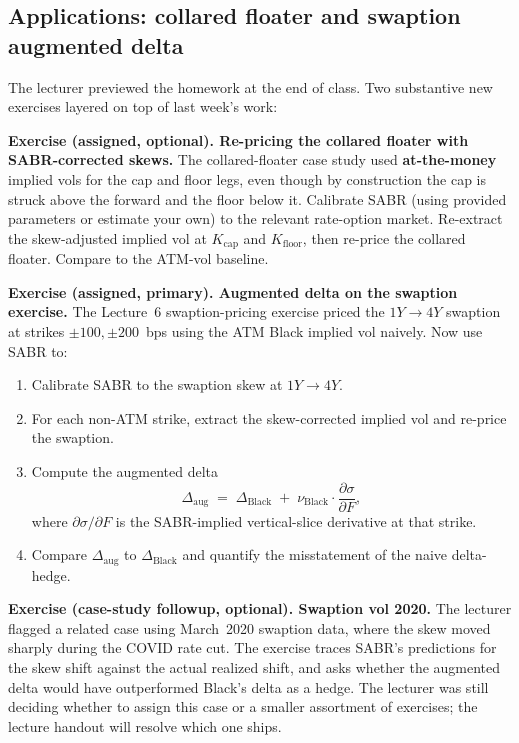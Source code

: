 \subsection{Applications: collared floater and swaption augmented delta}\label{L7-sec:applications}

The lecturer previewed the homework at the end of class. Two
substantive new exercises layered on top of last week's work:

\begin{exerciseblock}
\textbf{Exercise (assigned, optional). Re-pricing the collared floater
with SABR-corrected skews.} The collared-floater case study used
\textbf{at-the-money} implied vols for the cap and floor legs, even
though by construction the cap is struck above the forward and the
floor below it. Calibrate SABR (using provided parameters or estimate
your own) to the relevant rate-option market. Re-extract the
skew-adjusted implied vol at $K_{\text{cap}}$ and $K_{\text{floor}}$,
then re-price the collared floater. Compare to the ATM-vol
baseline.
\end{exerciseblock}

\begin{exerciseblock}
\textbf{Exercise (assigned, primary). Augmented delta on the swaption
exercise.} The Lecture~6 swaption-pricing exercise priced the
$1Y \to 4Y$ swaption at strikes $\pm 100, \pm 200$~bps using the ATM
Black implied vol naively. Now use SABR to:
\begin{enumerate}[label=(\arabic*)]
  \item Calibrate SABR to the swaption skew at $1Y \to 4Y$.
  \item For each non-ATM strike, extract the skew-corrected implied
        vol and re-price the swaption.
  \item Compute the augmented delta
        \[
          \Delta_{\text{aug}} \;=\; \Delta_{\text{Black}}
             \;+\; \nu_{\text{Black}} \cdot \frac{\partial \sigma}{\partial F},
        \]
        where $\partial \sigma / \partial F$ is the SABR-implied
        vertical-slice derivative at that strike.
  \item Compare $\Delta_{\text{aug}}$ to $\Delta_{\text{Black}}$ and quantify the
        misstatement of the naive delta-hedge.
\end{enumerate}
\end{exerciseblock}

\begin{exerciseblock}
\textbf{Exercise (case-study followup, optional). Swaption vol
2020.} The lecturer flagged a related case using March~2020 swaption
data, where the skew moved sharply during the COVID rate cut. The
exercise traces SABR's predictions for the skew shift against the
actual realized shift, and asks whether the augmented delta would
have outperformed Black's delta as a hedge. The lecturer was still
deciding whether to assign this case or a smaller assortment of
exercises; the lecture handout will resolve which one ships.
\end{exerciseblock}

